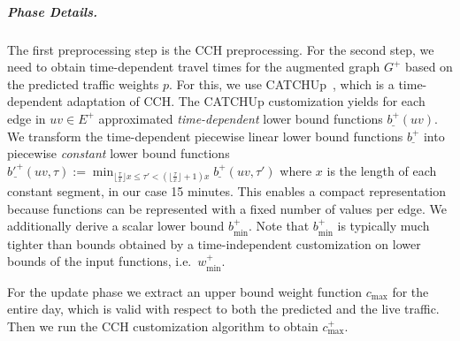 \documentclass[a4paper,UKenglish,cleveref, autoref, thm-restate,anonymous]{lipics-v2021}
\newcommand*{\comb}{c}
\newcommand*{\pcfn}{\underline{b'^+}}
\newcommand*{\bucketlen}{x}
\begin{document}
\subparagraph{Phase Details.}
The first preprocessing step is the CCH preprocessing.
For the second step, we need to obtain time-dependent travel times for the augmented graph $G^+$ based on the predicted traffic weights $p$.
For this, we use CATCHUp~\cite{swz-sfert-21}, which is a time-dependent adaptation of CCH.
The CATCHUp customization yields for each edge in $uv \in E^+$ approximated \emph{time-dependent} lower bound functions $\underline{b^+}(uv)$.
We transform the time-dependent piecewise linear lower bound functions $\underline{b^+}$ into piecewise \emph{constant} lower bound functions
$\pcfn(uv, \tau) := \min_{\lfloor \frac{\tau}{\bucketlen} \rfloor \bucketlen \leq \tau' < (\lfloor \frac{\tau}{\bucketlen} \rfloor + 1) \bucketlen} \underline{b^+}(uv, \tau')$
where $\bucketlen$ is the length of each constant segment, in our case 15 minutes.
This enables a compact representation because functions can be represented with a fixed number of values per edge.
We additionally derive a scalar lower bound $b^+_{\min}$.
Note that $b^+_{\min}$ is typically much tighter than bounds obtained by a time-independent customization on lower bounds of the input functions, i.e.\ $w^+_{\min}$.

For the update phase we extract an upper bound weight function $\comb_{\max}$ for the entire day, which is valid with respect to both the predicted and the live traffic.
Then we run the CCH customization algorithm to obtain $\comb^+_{\max}$.
\end{document}
